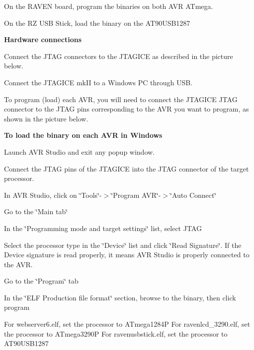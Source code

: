 \begin{DoxyItemize}
\item \-On the \-R\-A\-V\-E\-N board, program the binaries on both \-A\-V\-R \-A\-Tmega. \item \-On the \-R\-Z \-U\-S\-B \-Stick, load the binary on the \-A\-T90\-U\-S\-B1287\end{DoxyItemize}
{\bfseries \-Hardware connections}\par
 \begin{DoxyItemize}
\item \-Connect the \-J\-T\-A\-G connectors to the \-J\-T\-A\-G\-I\-C\-E as described in the picture below.\end{DoxyItemize}
 \begin{DoxyItemize}
\item \-Connect the \-J\-T\-A\-G\-I\-C\-E mk\-I\-I to a \-Windows \-P\-C through \-U\-S\-B. \item \-To program (load) each \-A\-V\-R, you will need to connect the \-J\-T\-A\-G\-I\-C\-E \-J\-T\-A\-G connector to the \-J\-T\-A\-G pins corresponding to the \-A\-V\-R you want to program, as shown in the picture below.\end{DoxyItemize}


{\bfseries \-To load the binary on each \-A\-V\-R in \-Windows}\par


\begin{DoxyItemize}
\item \-Launch \-A\-V\-R \-Studio and exit any popup window. \item \-Connect the \-J\-T\-A\-G pins of the \-J\-T\-A\-G\-I\-C\-E into the \-J\-T\-A\-G connector of the target processor. \item \-In \-A\-V\-R \-Studio, click on \char`\"{}\-Tools\char`\"{}-\/$>$\char`\"{}\-Program A\-V\-R\char`\"{}-\/$>$\char`\"{}\-Auto Connect\char`\"{} \item \-Go to the \char`\"{}\-Main tab\char`\"{} \item \-In the \char`\"{}\-Programming mode and target settings\char`\"{} list, select \-J\-T\-A\-G \item \-Select the processor type in the \char`\"{}\-Device\char`\"{} list and click \char`\"{}\-Read Signature\char`\"{}. \-If the \-Device signature is read properly, it means \-A\-V\-R \-Studio is properly connected to the \-A\-V\-R. \item \-Go to the \char`\"{}\-Program\char`\"{} tab \item \-In the \char`\"{}\-E\-L\-F Production file format\char`\"{} section, browse to the binary, then click program\end{DoxyItemize}
\begin{DoxyVerb}
For webserver6.elf, set the processor to ATmega1284P
For ravenlcd_3290.elf, set the processor to ATmega3290P
For ravenusbstick.elf, set the processor to AT90USB1287

\end{DoxyVerb}


